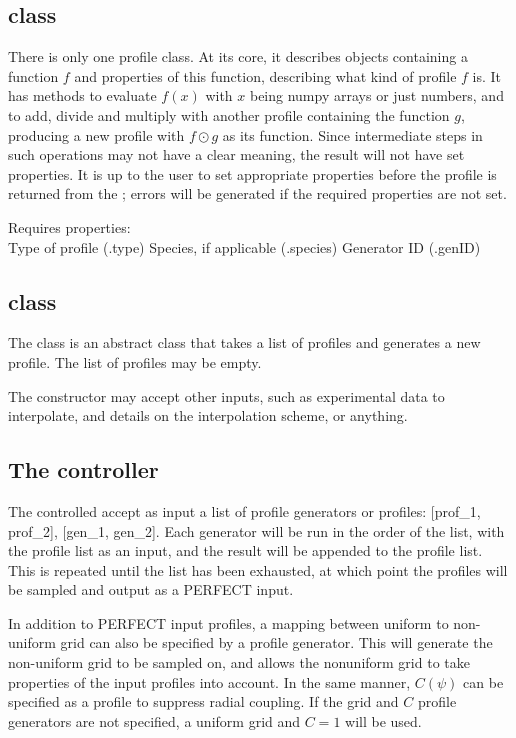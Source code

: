 \documentclass[12pt, a4paper]{article}
\begin{document}
\subsection{\prof class}
There is only one profile class. 
At its core, it describes objects containing a function $f$ and properties of this function, describing what kind of profile $f$ is. 
It has methods to evaluate $f(x)$ with $x$ being numpy arrays or just numbers, and to add, divide and multiply with another profile containing the function $g$, producing a new profile with $f \odot g$ as its function. Since intermediate steps in such operations may not have a clear meaning, the result will not have set properties. It is up to the user to set appropriate properties before the profile is returned from the \profGen; errors will be generated if the required properties are not set.

Requires properties: \\
Type of profile (.type)
Species, if applicable (.species)
Generator ID (.genID)


\subsection{\profGen class}
The \profGen class is an abstract class that takes a list of profiles and generates a new profile. The list of profiles may be empty.
 
The \profGen constructor may accept other inputs, such as experimental data to interpolate, and details on the interpolation scheme, or anything. 


\subsection{The controller}
The controlled accept as input a list of profile generators or profiles: [prof_1, prof_2], [gen_1, gen_2]. Each generator will be run in the order of the list, with the profile list as an input, and the result will be appended to the profile list. This is repeated until the list has been exhausted, at which point the profiles will be sampled and output as a PERFECT input. 

In addition to PERFECT input profiles, a mapping between uniform to non-uniform grid can also be specified by a profile generator. This will generate the non-uniform grid to be sampled on, and allows the nonuniform grid to take properties of the input profiles into account.
In the same manner, $C(\psi)$ can be specified as a profile to suppress radial coupling. 
If the grid and $C$ profile generators are not specified, a uniform grid and $C=1$ will be used.
\end{document}
